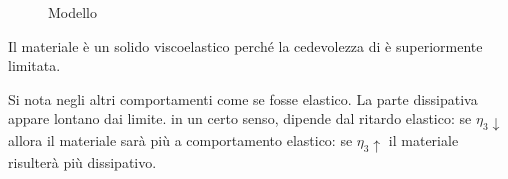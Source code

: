 \begin{figure}
\centering
{}	\quad
{}	
\caption{Modello }
\label{fig:ModelloZener}
\end{figure}

Il materiale è un solido viscoelastico perché la cedevolezza di  è superiormente limitata.

Si nota negli altri comportamenti come se fosse elastico. La parte dissipativa appare lontano dai limite. in un certo senso, dipende dal ritardo elastico: se $\eta_3\downarrow$ allora il materiale sarà più a comportamento elastico: se $\eta_3\uparrow$ il materiale risulterà più dissipativo.

